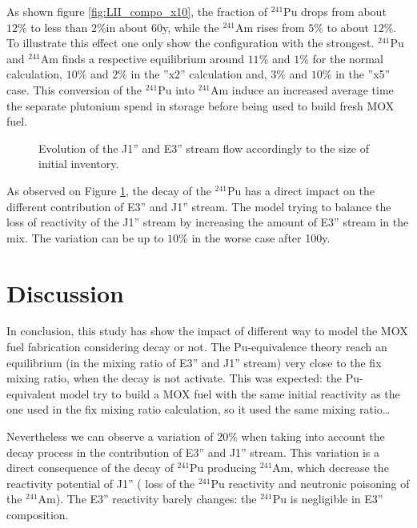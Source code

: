 \documentclass[12pt]{article}
\begin{document}
As shown figure \ref{fig:LII_compo_x10}, the fraction of $^{241}$Pu drops from
about $12\%$ to less than $2\%$in about 60y, while the $^{241}$Am rises from
$5\%$ to about $12\%$. To illustrate this effect one only show the configuration
with the strongest. $^{241}$Pu and $^{241}$Am finds a respective equilibrium
around $11\%$ and $1\%$ for the normal calculation, $10\%$ and $2\%$ in the
''x2'' calculation and, $3\%$ and $10\%$ in the ''x5'' case. This conversion of
the $^{241}$Pu into $^{241}$Am induce an increased average time the separate
plutonium spend in storage before being used to build fresh MOX fuel.

\begin{figure}[h!]
  \centering
  

  \caption{ Evolution of the J1'' and E3'' stream flow accordingly to the size
    of initial inventory. \label{fig:LII} } 
  \end{figure}

As observed on Figure \ref{fig:LII}, the decay of the $^{241}$Pu has a direct
impact on the different contribution of E3'' and J1'' stream. The model trying
to balance the loss of reactivity of the J1'' stream by increasing the amount of
E3'' stream in the mix. The variation can be up to $10\%$ in the worse case
after 100y.

\section{Discussion}

In conclusion, this study has show the impact of different way to model
the MOX fuel fabrication considering decay or not.
The Pu-equivalence theory reach an equilibrium (in the mixing ratio of E3'' and
J1'' stream) very close to the fix mixing ratio, when the decay is not activate.
This was expected: the Pu-equivalent model try to build a MOX fuel with the same
initial reactivity as the one used in the fix mixing ratio calculation, so it
used the same mixing ratio\dots  

Nevertheless we can observe a variation of $20\%$ when taking into account the
decay process in the contribution of E3'' and J1'' stream. This variation is a
direct consequence of the decay of $^{241}$Pu producing $^{241}$Am, which
decrease the reactivity potential of J1'' ( loss of the $^{241}$Pu reactivity
and neutronic poisoning of the $^{241}$Am). The E3'' reactivity barely changes:
the $^{241}$Pu is negligible in E3'' composition.
\end{document}
